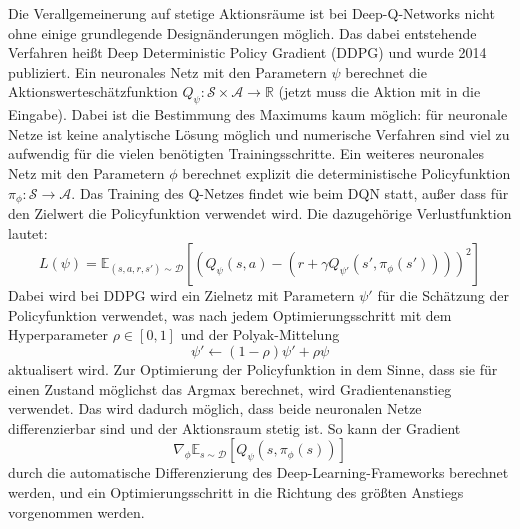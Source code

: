 Die Verallgemeinerung auf stetige Aktionsräume ist bei Deep-Q-Networks nicht ohne einige grundlegende Designänderungen möglich.
Das dabei entstehende Verfahren heißt Deep Deterministic Policy Gradient (DDPG) und wurde 2014 publiziert. \cite{10.5555/3044805.3044850}
Ein neuronales Netz mit den Parametern $\psi$ berechnet die Aktionswerteschätzfunktion $Q_\psi: \mathcal{S} \times \mathcal{A}\rightarrow \mathbb{R}$ (jetzt muss die Aktion mit in die Eingabe).
Dabei ist die Bestimmung des Maximums kaum möglich: für neuronale Netze ist keine analytische Lösung möglich und numerische Verfahren sind viel zu aufwendig für die vielen benötigten Trainingsschritte.
Ein weiteres neuronales Netz mit den Parametern $\phi$ berechnet explizit die deterministische Policyfunktion $\pi_\phi: \mathcal{S} \rightarrow \mathcal{A}$.
Das Training des Q-Netzes findet wie beim DQN statt, außer dass für den Zielwert die Policyfunktion verwendet wird.
Die dazugehörige Verlustfunktion lautet:
\begin{equation}
	L(\psi) = \mathbb{E}_{(s, a, r, s')\sim\mathcal{D}}\left[\left(Q_\psi(s,a)-\left(r+\gamma Q_{\psi'}(s',\pi_\phi(s'))\right)\right)^2\right]
\end{equation}
Dabei wird bei DDPG wird ein Zielnetz mit Parametern $\psi'$ für die Schätzung der Policyfunktion verwendet, was nach jedem Optimierungsschritt mit dem Hyperparameter $\rho \in [0, 1]$ und der Polyak-Mittelung
\begin{equation}
	\psi' \leftarrow (1 - \rho) \psi' + \rho \psi
\end{equation}
aktualisert wird.
Zur Optimierung der Policyfunktion in dem Sinne, dass sie für einen Zustand möglichst das Argmax berechnet, wird Gradientenanstieg verwendet.
Das wird dadurch möglich, dass beide neuronalen Netze differenzierbar sind und der Aktionsraum stetig ist.
So kann der Gradient
\begin{equation}
	\nabla_\phi \mathbb{E}_{s\sim\mathcal{D}}\left[Q_\psi(s, \pi_\phi(s))\right]
\end{equation}
durch die automatische Differenzierung des Deep-Learning-Frameworks berechnet werden, und ein Optimierungsschritt in die Richtung des größten Anstiegs vorgenommen werden.

